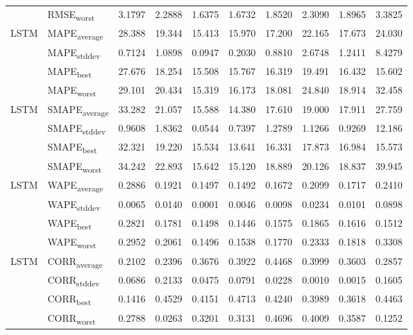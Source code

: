 {\begin{longtable}{l l c c c c c c c c}
 & RMSE\textsubscript{worst} & 3.1797 & 2.2888 & 1.6375 & 1.6732 & 1.8520 & 2.3090 & 1.8965 & 3.3825 \\
\cmidrule(lr){2-10}
\multirow{4}{*}{LSTM} & MAPE\textsubscript{average} & 28.388 & 19.344 & 15.413 & 15.970 & 17.200 & 22.165 & 17.673 & 24.030 \\
 & MAPE\textsubscript{stddev} & 0.7124 & 1.0898 & 0.0947 & 0.2030 & 0.8810 & 2.6748 & 1.2411 & 8.4279 \\
 & MAPE\textsubscript{best} & 27.676 & 18.254 & 15.508 & 15.767 & 16.319 & 19.491 & 16.432 & 15.602 \\
 & MAPE\textsubscript{worst} & 29.101 & 20.434 & 15.319 & 16.173 & 18.081 & 24.840 & 18.914 & 32.458 \\
\cmidrule(lr){2-10}
\multirow{4}{*}{LSTM} & SMAPE\textsubscript{average} & 33.282 & 21.057 & 15.588 & 14.380 & 17.610 & 19.000 & 17.911 & 27.759 \\
 & SMAPE\textsubscript{stddev} & 0.9608 & 1.8362 & 0.0544 & 0.7397 & 1.2789 & 1.1266 & 0.9269 & 12.186 \\
 & SMAPE\textsubscript{best} & 32.321 & 19.220 & 15.534 & 13.641 & 16.331 & 17.873 & 16.984 & 15.573 \\
 & SMAPE\textsubscript{worst} & 34.242 & 22.893 & 15.642 & 15.120 & 18.889 & 20.126 & 18.837 & 39.945 \\
\cmidrule(lr){2-10}
\multirow{4}{*}{LSTM} & WAPE\textsubscript{average} & 0.2886 & 0.1921 & 0.1497 & 0.1492 & 0.1672 & 0.2099 & 0.1717 & 0.2410 \\
 & WAPE\textsubscript{stddev} & 0.0065 & 0.0140 & 0.0001 & 0.0046 & 0.0098 & 0.0234 & 0.0101 & 0.0898 \\
 & WAPE\textsubscript{best} & 0.2821 & 0.1781 & 0.1498 & 0.1446 & 0.1575 & 0.1865 & 0.1616 & 0.1512 \\
 & WAPE\textsubscript{worst} & 0.2952 & 0.2061 & 0.1496 & 0.1538 & 0.1770 & 0.2333 & 0.1818 & 0.3308 \\
\cmidrule(lr){2-10}
\multirow{4}{*}{LSTM} & CORR\textsubscript{average} & 0.2102 & 0.2396 & 0.3676 & 0.3922 & 0.4468 & 0.3999 & 0.3603 & 0.2857 \\
 & CORR\textsubscript{stddev} & 0.0686 & 0.2133 & 0.0475 & 0.0791 & 0.0228 & 0.0010 & 0.0015 & 0.1605 \\
 & CORR\textsubscript{best} & 0.1416 & 0.4529 & 0.4151 & 0.4713 & 0.4240 & 0.3989 & 0.3618 & 0.4463 \\
 & CORR\textsubscript{worst} & 0.2788 & 0.0263 & 0.3201 & 0.3131 & 0.4696 & 0.4009 & 0.3587 & 0.1252 \\

\end{longtable}}
